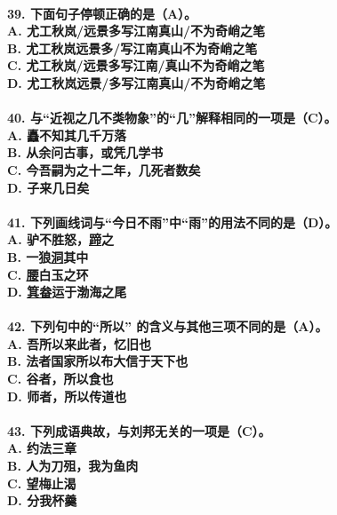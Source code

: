 \documentclass[UTF8]{ctexart} %
\begin{document}
\paragraph{
39. 下面句子停顿正确的是（\color{red}A\color{black}）。 \\
    A. 尤工秋岚/远景多写江南真山/不为奇峭之笔 \\
    B. 尤工秋岚远景多/写江南真山不为奇峭之笔 \\
    C. 尤工秋岚/远景多写江南/真山不为奇峭之笔 \\
    D. 尤工秋岚远景/多写江南真山/不为奇峭之笔
}
\paragraph{
40. 与“近视之几不类物象”的“几”解释相同的一项是（\color{red}C\color{black}）。 \\
    A. 矗不知其几千万落 \\
    B. 从余问古事，或凭几学书 \\
    C. 今吾嗣为之十二年，几死者数矣 \\
    D. 子来几日矣
}
\paragraph{
41. 下列画线词与“今日不雨”中“雨”的用法不同的是（\color{red}D\color{black}）。 \\
    A. 驴不胜怒，\uline{蹄}之 \\
    B. 一狼\uline{洞}其中 \\
    C. \uline{腰}白玉之环 \\
    D. \uline{箕畚}运于渤海之尾
}
\paragraph{
42. 下列句中的“所以” 的含义与其他三项不同的是（\color{red}A\color{black}）。 \\
    A. 吾所以来此者，忆旧也 \\
    B. 法者国家所以布大信于天下也 \\
    C. 谷者，所以食也 \\
    D. 师者，所以传道也
}
\paragraph{
43. 下列成语典故，与刘邦无关的一项是（\color{red}C\color{black}）。 \\
    A. 约法三章 \\
    B. 人为刀殂，我为鱼肉 \\
    C. 望梅止渴 \\
    D. 分我杯羹
}
\end{document}
